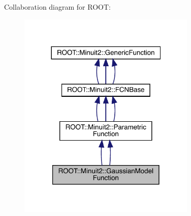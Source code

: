Collaboration diagram for R\+O\+OT\+:
\nopagebreak
\begin{figure}[H]
\begin{center}
\leavevmode
\includegraphics[width=240pt]{da/d35/classROOT_1_1Minuit2_1_1GaussianModelFunction__coll__graph}
\end{center}
\end{figure}
